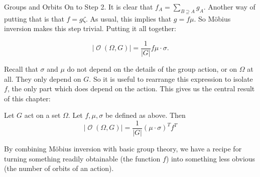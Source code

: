\documentclass[12pt]{pom_thesis}
\DeclareMathOperator{\orb}{\mathcal{O}}
\begin{document}
\begin{chapter}{Groups and Orbits}
On to Step 2. It is clear that $f_A = \sum_{B \supseteq A} g_A$. Another way of putting that is that $f = g\zeta$. As usual, this implies that $g = f\mu$. So M\"obius inversion makes this step trivial. Putting it all together:

\[|\orb(\Omega, G)| = \frac {1}{|G|}f\mu \cdot \sigma.\]

Recall that $\sigma$ and $\mu$ do not depend on the details of the group action, or on $\Omega$ at all. They only depend on $G$. So it is useful to rearrange this expression to isolate $f$, the only part which does depend on the action. This gives us the central result of this chapter:
\begin{thm}\label{orbit_count}
Let $G$ act on a set $\Omega$. Let $f, \mu, \sigma$ be defined as above. Then
\[
|\orb(\Omega, G)| = \frac {1}{|G|}(\mu \cdot \sigma)^Tf^T
\]
\end{thm}

By combining M\"obius inversion with basic group theory, we have a recipe for turning something readily obtainable (the function $f$) into something less obvious (the number of orbits of an action).


\end{chapter}
\end{document}
